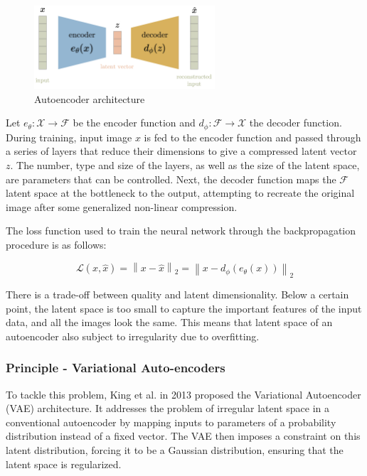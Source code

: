 \documentclass{article}
\begin{document}
\begin{figure}[H]
    \centering
    \includegraphics[width=0.6\textwidth]{images/ae.png}
    \caption{Autoencoder architecture}
\end{figure}

Let $e_{\theta}:\mathcal{X}\to \mathcal{F}$ be the encoder function and $d_{\phi}:\mathcal{F}\to \mathcal{X}$ the decoder function. 
During training, input image $x$ is fed to the encoder function and passed through a series of layers that reduce their dimensions to give a compressed latent vector $z$. 
The number, type and size of the layers, as well as the size of the latent space, are parameters that can be controlled. 
Next, the decoder function maps the $\mathcal{F}$ latent space at the bottleneck to the output, attempting to recreate the original image after some generalized non-linear compression. 

The loss function used to train the neural network through the backpropagation procedure is as follows: 

\[\mathcal{L}(x,\hat{x})=\left\| x-\hat{x}\right\|_{2}=\left\| x-d_{\phi}(e_{\theta}(x)) \right\|_{2}\]

There is a trade-off between quality and latent dimensionality. Below a certain point, the latent space is too small to capture the important features of the input data, and all the images look the same.
This means that latent space of an autoencoder also subject to irregularity due to overfitting. 

\subsubsection*{Principle - Variational Auto-encoders}
To tackle this problem, King et al. in 2013 proposed the Variational Autoencoder (VAE) architecture. It addresses the problem of irregular latent space in a conventional autoencoder by mapping inputs to parameters of a probability distribution instead of a fixed vector.
The VAE then imposes a constraint on this latent distribution, forcing it to be a Gaussian distribution, ensuring that the latent space is regularized.
\end{document}
